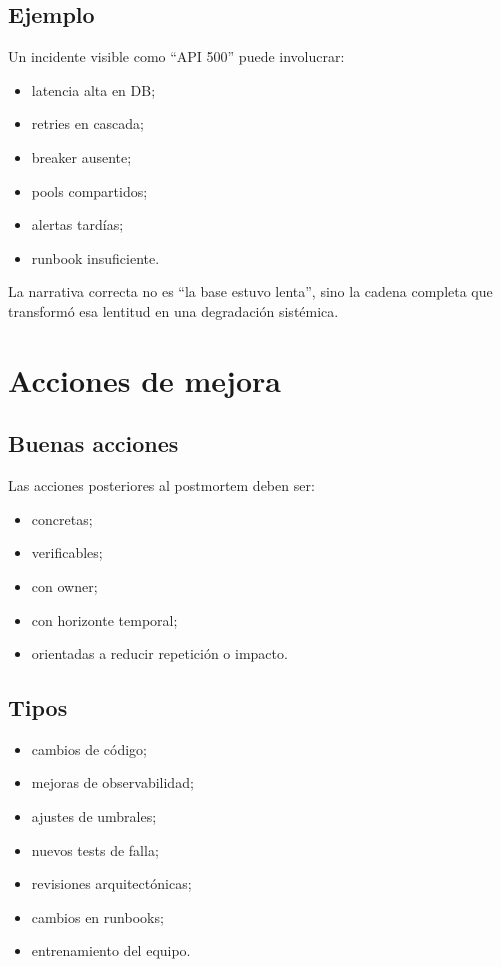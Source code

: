 \documentclass[variant=apuntes,cover=institutional,mode=screen]{ua-engineering-v6-article}
\begin{document}
\subsection{Ejemplo}

Un incidente visible como “API 500” puede involucrar:
\begin{itemize}
\item latencia alta en DB;
\item retries en cascada;
\item breaker ausente;
\item pools compartidos;
\item alertas tardías;
\item runbook insuficiente.
\end{itemize}

La narrativa correcta no es “la base estuvo lenta”, sino la cadena completa que transformó esa lentitud en una degradación sistémica.

\section{Acciones de mejora}

\subsection{Buenas acciones}

Las acciones posteriores al postmortem deben ser:
\begin{itemize}
\item concretas;
\item verificables;
\item con owner;
\item con horizonte temporal;
\item orientadas a reducir repetición o impacto.
\end{itemize}

\subsection{Tipos}

\begin{itemize}
\item cambios de código;
\item mejoras de observabilidad;
\item ajustes de umbrales;
\item nuevos tests de falla;
\item revisiones arquitectónicas;
\item cambios en runbooks;
\item entrenamiento del equipo.
\end{itemize}
\end{document}
